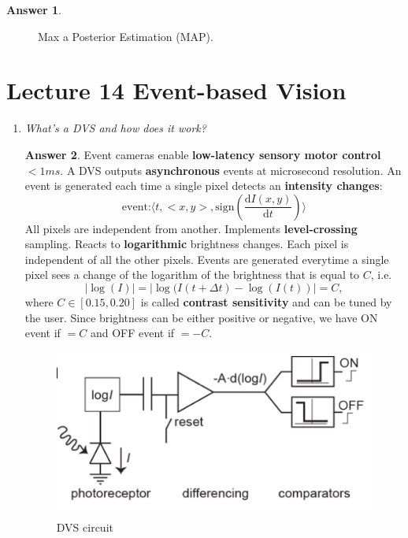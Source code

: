 \documentclass[a4paper,12 pt]{article}
\theoremstyle{definition}
\theoremstyle{remark}
\theoremstyle{definition}
\theoremstyle{definition}
\theoremstyle{definition}
\theoremstyle{definition}
\theoremstyle{remark}
\theoremstyle{remark}
\theoremstyle{definition}
\theoremstyle{definition}
\newtheorem*{answer}{Answer}
\begin{document}
\begin{enumerate}
\begin{answer}
\begin{figure}[h]
\begin{center}
\caption{Max a Posterior Estimation (MAP).}
\end{center}
\end{figure}
\end{answer}
\end{enumerate}
\newpage
\section*{Lecture 14 Event-based Vision}
\begin{enumerate}
\item \textit{What’s a DVS and how does it work? }
\begin{answer}
Event cameras enable \textbf{low-latency sensory motor control $<1ms$}.  A DVS outputs \textbf{asynchronous} events at microsecond resolution. An event is generated each time a single pixel detects an \textbf{intensity changes}:
\begin{equation}
\text{event:} \langle t,<x,y>,\text{sign}\left(\frac{\text{d}I(x,y)}{\text{d}t} \right)\rangle
\end{equation}
All pixels are independent from another. Implements \textbf{level-crossing} sampling. Reacts to \textbf{logarithmic} brightness changes. Each pixel is independent of all the other pixels. Events are generated everytime a single pixel sees a change of the logarithm of the brightness that is equal to $C$, i.e.
\begin{equation}
|\log(I)|=|\log(I(t+\Delta t)-\log(I(t))|=C,
\end{equation}
where $C \in [0.15,0.20]$ is called \textbf{contrast sensitivity} and can be tuned by the user. Since brightness can be either positive or negative, we have ON event if $=C$ and OFF event if $=-C$.
\begin{figure}[tbh]
\begin{center}
\includegraphics[scale=0.6]{pics/dvsel}
\caption{DVS circuit}
\end{center}

\end{figure}
\end{answer}
\end{enumerate}
\end{document}
